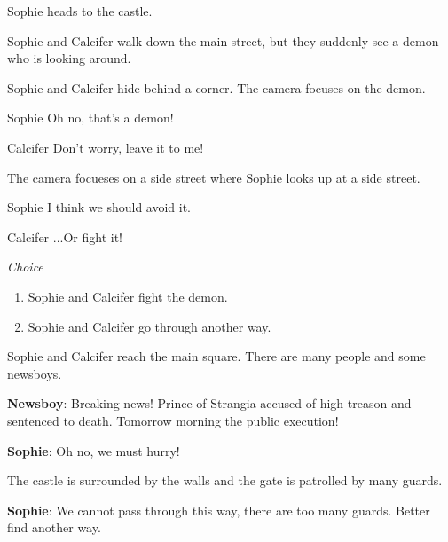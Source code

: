 Sophie heads to the castle.


Sophie and Calcifer walk down the main street, but they suddenly see a demon who is looking around.

\begin{screenplay}

Sophie and Calcifer hide behind a corner. The camera focuses on the demon.

\begin{dialogue}[worried]{Sophie}
Oh no, that’s a demon!
\end{dialogue}
\begin{dialogue}[feisty]{Calcifer}
Don’t worry, leave it to me!
\end{dialogue}

The camera focueses on a side street where Sophie looks up at a side street.

\begin{dialogue}{Sophie}
I think we should avoid it.
\end{dialogue}

\begin{dialogue}{Calcifer}
...Or fight it!
\end{dialogue}
\end{screenplay}
\vspace{1em}

\textit{Choice}
\begin{enumerate}
  \item Sophie and Calcifer fight the demon.
  \item Sophie and Calcifer go through another way.
\end{enumerate}
  
Sophie and Calcifer reach the main square. There are many people and some newsboys.

\textbf{Newsboy}: Breaking news! Prince of Strangia accused of high treason and sentenced to death. Tomorrow morning the public execution!

\textbf{Sophie}: Oh no, we must hurry!

The castle is surrounded by the walls and the gate is patrolled by many guards.


\textbf{Sophie}: We cannot pass through this way, there are too many guards. Better find another way.

